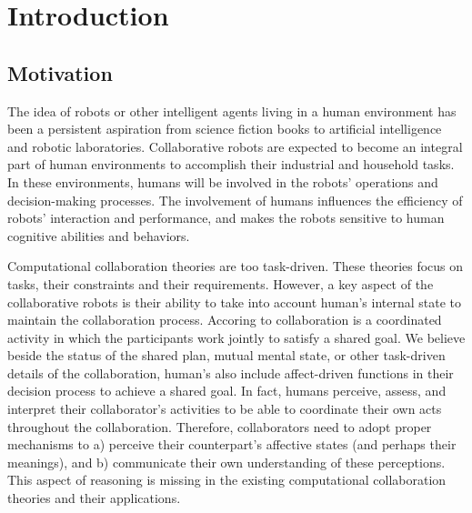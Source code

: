 \documentclass[12pt]{report}
\begin{document}
\pagebreak

\tableofcontents
\pagebreak

\listoffigures
\pagebreak

\listoftables
\pagebreak

\listofalgorithms
{}
\pagebreak


\chapter{Introduction}
\label{ch:introduction}

\section{Motivation}

The idea of robots or other intelligent agents living in a human environment has
been a persistent aspiration from science fiction books to artificial
intelligence and robotic laboratories. Collaborative robots are expected to
become an integral part of human environments to accomplish their industrial
and household tasks. In these environments, humans will be involved in
the robots' operations and decision-making processes. The involvement of humans
influences the efficiency of robots' interaction and performance, and makes the
robots sensitive to human cognitive abilities and behaviors.

Computational collaboration theories are too task-driven. These theories focus
on tasks, their constraints and their requirements. However, a key aspect of the
collaborative robots is their ability to take into account human's internal
state to maintain the collaboration process. Accoring to
\cite{grosz:plans-discourse} collaboration is a coordinated activity in which
the participants work jointly to satisfy a shared goal. We believe beside
the status of the shared plan, mutual mental state, or other task-driven details
of the collaboration, human's also include affect-driven functions in their
decision process to achieve a shared goal. In fact, humans perceive, assess, and
interpret their collaborator's activities to be able to coordinate their own
acts throughout the collaboration. Therefore, collaborators need to adopt proper
mechanisms to a) perceive their counterpart's affective states (and perhaps
their meanings), and b) communicate their own understanding of these
perceptions. This aspect of reasoning is missing in the existing computational
collaboration theories and their applications.
\end{document}
